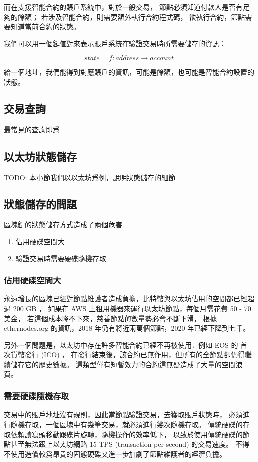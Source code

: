 而在支援智能合約的賬戶系統中，對於一般交易，
節點必須知道付款人是否有足夠的餘額；
若涉及智能合約，則需要額外執行合約程式碼，
欲執行合約，節點需要知道當前合約的狀態。

我們可以用一個鍵值對來表示賬戶系統在驗證交易時所需要儲存的資訊：

\[state = f: address\to account \]

給一個地址，我們能得到對應賬戶的資訊，可能是餘額，也可能是智能合約設置的狀態。

\subsection{交易查詢}
最常見的查詢即爲

\subsection{以太坊狀態儲存}

TODO: 本小節我們以以太坊爲例，說明狀態儲存的細節

\subsection{狀態儲存的問題}

區塊鏈的狀態儲存方式造成了兩個危害

\begin{enumerate}
  \item 佔用硬碟空間大
  \item 驗證交易時需要硬碟隨機存取
\end{enumerate}

\subsubsection{佔用硬碟空間大}
永遠增長的區塊已經對節點維護者造成負擔，比特幣與以太坊佔用的空間都已經超過 200 GB ，
如果在 AWS 上租用機器來運行以太坊節點，每個月需花費 50 - 70 美金，
若這個成本降不下來，慈善節點的數量勢必會不斷下滑，
根據 ethernodes.org 的資訊，2018 年仍有將近兩萬個節點，2020 年已經下降到七千。

另外一個問題是，以太坊中存在許多智能合約已經不再被使用，例如 EOS 的 首次貨幣發行 (ICO) ，
在發行結束後，該合約已無作用，但所有的全節點卻仍得繼續儲存它的歷史數據。
這類型僅有短暫效力的合約這無疑造成了大量的空間浪費。

\subsubsection{需要硬碟隨機存取}
交易中的賬戶地址沒有規則，因此當節點驗證交易，去獲取賬戶狀態時，
必須進行隨機存取，一個區塊中有幾筆交易，就必須進行幾次隨機存取。
傳統硬碟的存取依賴讀寫頭移動跟碟片旋轉，隨機操作的效率低下，
以致於使用傳統硬碟的節點甚至無法跟上以太坊網路 15 TPS (transaction per second) 的交易速度。
不得不使用造價較爲昂貴的固態硬碟又進一步加劇了節點維護者的經濟負擔。

